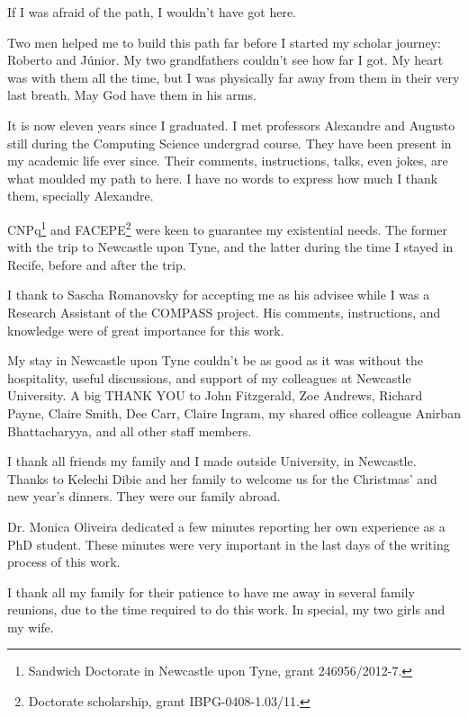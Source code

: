 \documentclass[12pt,openright,twoside,a4paper,oldfontcommands,english,brazil,final]{abntex2}
\theoremstyle{theo}
\begin{document}
\begin{agradecimentos}

If I was afraid of the path, I wouldn't have got here.

Two men helped me to build this path far before I started my scholar journey: Roberto and Júnior.
My two grandfathers couldn't see how far I got.
My heart was with them all the time, but I was physically far away from them in their very last breath.
May God have them in his arms.

It is now eleven years since I graduated.
I met professors Alexandre and Augusto still during the Computing Science undergrad course.
They have been present in my academic life ever since.
Their comments, instructions, talks, even jokes, are what moulded my path to here.
I have no words to express how much I thank them, specially Alexandre.

CNPq\footnote{Sandwich Doctorate in Newcastle upon Tyne, grant 246956/2012-7.} and FACEPE\footnote{Doctorate scholarship, grant IBPG-0408-1.03/11.} were keen to guarantee my existential needs.
The former with the trip to Newcastle upon Tyne, and the latter during the time I stayed in Recife, before and after the trip.

I thank to Sascha Romanovsky for accepting me as his advisee while I was a Research Assistant of the COMPASS project.
His comments, instructions, and knowledge were of great importance for this work.

My stay in Newcastle upon Tyne couldn't be as good as it was without the hospitality, useful discussions, and support of my colleagues at Newcastle University.
A big THANK YOU to John Fitzgerald, Zoe Andrews, Richard Payne, Claire Smith, Dee Carr, Claire Ingram, my shared office colleague Anirban Bhattacharyya, and all other staff members.

I thank all friends my family and I made outside University, in Newcastle.
Thanks to Kelechi Dibie and her family to welcome us for the Christmas' and new year's dinners.
They were our family abroad.

Dr. Monica Oliveira dedicated a few minutes reporting her own experience as a PhD student. These minutes were very important in the last days of the writing process of this work.

I thank all my family for their patience to have me away in several family reunions, due to the time required to do this work.
In special, my two girls and my wife.

\end{agradecimentos}
\end{document}
